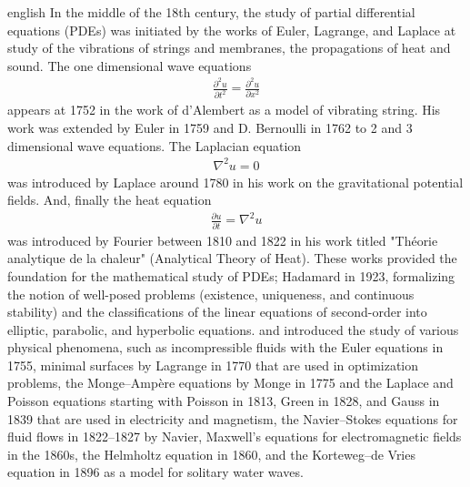 \documentclass[0000.tex]{subfiles}
\begin{document}
\begin{hyphenrules}{english}
In the middle of the 18th century, the study of partial differential equations (PDEs) was initiated by the works of Euler, Lagrange, and Laplace at study of the 
vibrations of strings and membranes, the propagations of heat and sound. The one dimensional wave equations
\begin{align*}
    \frac{\partial^2 u}{\partial t^2} = \frac{\partial^2 u}{\partial x^2}
\end{align*}
appears at 1752 in the work of d'Alembert as a model of vibrating string. His work was extended by Euler in 1759 and D. Bernoulli in 1762 to 2 and 3 dimensional 
wave equations. The Laplacian equation
\begin{align*}
    \nabla^2 u = 0
\end{align*}
was introduced by Laplace around 1780 in his work on the gravitational potential fields. And, finally the heat equation
\begin{align*}
    \frac{\partial u}{\partial t} = \nabla^2 u
\end{align*}
was introduced by Fourier between 1810 and 1822 in his work titled "Théorie analytique de la chaleur" (Analytical Theory of Heat). 
These works provided the foundation for the mathematical study of PDEs; Hadamard in 1923, formalizing the notion of well-posed problems (existence, uniqueness, 
and continuous stability) and the classifications of the linear equations of second-order into elliptic, parabolic, and hyperbolic equations.
and introduced the study of various physical phenomena, such as incompressible fluids with the Euler equations in 1755, minimal surfaces by Lagrange in 1770 
that are used in optimization problems, the Monge–Ampère equations by Monge in 1775 and the Laplace and Poisson equations starting with Poisson in 1813, 
Green in 1828, and Gauss in 1839 that are used in electricity and magnetism, the Navier–Stokes equations for fluid flows in 1822–1827 by Navier, Maxwell's 
equations for electromagnetic fields in the 1860s, the Helmholtz equation in 1860, and the Korteweg–de Vries equation in 1896 as a model for solitary water waves.


\end{hyphenrules}
\end{document}

